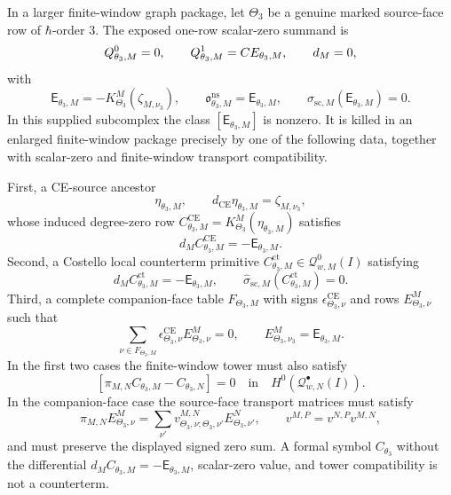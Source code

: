 \documentclass[11pt]{memoir}
\begin{document}
\begin{prop}\label{prop:theta-three-finite-window-acceptance-gate}
  In a larger finite-window graph package, let \(\Theta_3\) be a genuine
  marked source-face row of \(\hbar\)-order \(3\).  The exposed
  one-row scalar-zero summand is
  \[
    Q^0_{\theta_3,M}=0,\qquad
    Q^1_{\theta_3,M}=CE_{\theta_3,M},\qquad
    d_M=0,
  \]
  with
  \[
    \mathsf E_{\theta_3,M}
      =
      -K^M_{\Theta_3}(\zeta_{M,\nu_3}),\qquad
    \mathfrak o^{\mathrm{ns}}_{\theta_3,M}
      =
      \mathsf E_{\theta_3,M},
    \qquad
    \widehat\sigma_{\mathrm{sc},M}(\mathsf E_{\theta_3,M})=0 .
  \]
  In this supplied subcomplex the class
  \([\mathsf E_{\theta_3,M}]\) is nonzero.  It is killed in an enlarged
  finite-window package precisely by one of the following data, together
  with scalar-zero and finite-window transport compatibility.

  First, a CE-source ancestor
  \[
    \eta_{\theta_3,M},\qquad
    d_{\mathrm{CE}}\eta_{\theta_3,M}=\zeta_{M,\nu_3},
  \]
  whose induced degree-zero row
  \(C^{\mathrm{CE}}_{\theta_3,M}=K^M_{\Theta_3}(\eta_{\theta_3,M})\)
  satisfies
  \[
    d_MC^{\mathrm{CE}}_{\theta_3,M}=-\mathsf E_{\theta_3,M}.
  \]
  Second, a Costello local counterterm primitive
  \(C^{\mathrm{ct}}_{\theta_3,M}\in\mathcal Q^0_{w,M}(I)\) satisfying
  \[
    d_MC^{\mathrm{ct}}_{\theta_3,M}=-\mathsf E_{\theta_3,M},\qquad
    \widehat\sigma_{\mathrm{sc},M}
      (C^{\mathrm{ct}}_{\theta_3,M})=0.
  \]
  Third, a complete companion-face table
  \(F_{\Theta_3,M}\) with signs
  \(\epsilon^{\mathrm{CE}}_{\Theta_3,\nu}\) and rows
  \(E^M_{\Theta_3,\nu}\) such that
  \[
    \sum_{\nu\in F_{\Theta_3,M}}
      \epsilon^{\mathrm{CE}}_{\Theta_3,\nu}E^M_{\Theta_3,\nu}=0,
    \qquad
    E^M_{\Theta_3,\nu_3}=\mathsf E_{\theta_3,M}.
  \]
  In the first two cases the finite-window tower must also satisfy
  \[
    [\pi_{M,N}C_{\theta_3,M}-C_{\theta_3,N}]
      =
      0
      \quad\text{in}\quad
      H^0(\mathcal Q^\bullet_{w,N}(I)).
  \]
  In the companion-face case the source-face transport matrices must
  satisfy
  \[
    \pi_{M,N}E^M_{\Theta_3,\nu}
      =
      \sum_{\nu'}
      v^{M,N}_{\Theta_3,\nu;\Theta_3,\nu'}
      E^N_{\Theta_3,\nu'},
    \qquad
    v^{M,P}=v^{N,P}v^{M,N},
  \]
  and must preserve the displayed signed zero sum.  A formal symbol
  \(C_{\theta_3}\) without the differential
  \(d_MC_{\theta_3,M}=-\mathsf E_{\theta_3,M}\), scalar-zero value, and
  tower compatibility is not a counterterm.


\end{prop}
\end{document}
